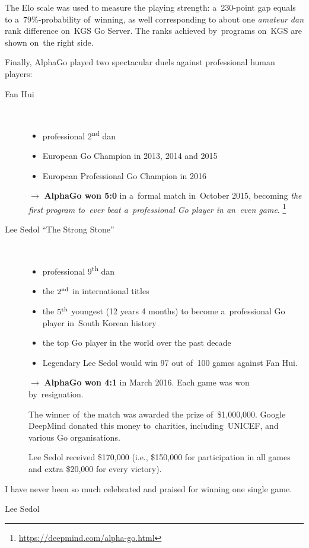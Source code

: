 The Elo scale was used to measure the playing strength:
a~230-point gap equals to a~79\%-probability of~winning, as well corresponding to about one \emph{amateur dan} rank difference on~KGS Go Server\footnotemark.
The ranks achieved by~programs on~KGS are shown on~the right side.

Finally, AlphaGo played two spectacular duels against professional human players:
\begin{description}
  \item [Fan Hui]~
    \begin{itemize}
      \item professional 2\textsuperscript{nd} dan
      \item European Go Champion in 2013, 2014 and 2015
      \item European Professional Go Champion in 2016 
    \end{itemize}
    $\rightarrow$ \textbf{AlphaGo won 5:0} in a~formal match in~October 2015, becoming \emph{the first program to~ever beat a~professional Go player in an~even game}.%
    \footnote{\href{https://deepmind.com/alpha-go.html}{https://deepmind.com/alpha-go.html}}

  \item [Lee Sedol ``The Strong Stone'']~
    \begin{itemize}
      \item professional 9\textsuperscript{th} dan 
      \item the $2\textsuperscript{nd}$ in international titles
      \item the $5\textsuperscript{th}$ youngest (12 years 4 months) to become a~professional Go player in~South Korean history
      \item the top Go player in the world over the past decade
      \item Legendary Lee Sedol would win 97 out of~100 games against Fan Hui.
    \end{itemize}
    $\rightarrow$ \textbf{AlphaGo won 4:1} in March 2016.
    Each game was won by~resignation.

    The winner of~the match was awarded the prize of~\$1,000,000.
    Google DeepMind donated this money to~charities, including~UNICEF, and various Go organisations.

    Lee Sedol received \$170,000 (i.e., \$150,000 for participation in all games and extra \$20,000 for every victory).
\end{description}

\epigraph{
  I have never been so much celebrated and praised for winning one single game.
}{Lee Sedol}

